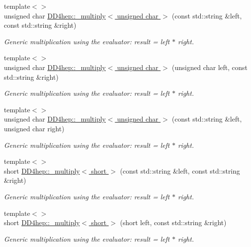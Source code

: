 \begin{DoxyCompactItemize}
{\footnotesize template$<$$>$ }\\unsigned char \hyperlink{group___d_d4_h_e_p___g_e_o_m_e_t_r_y_ga73881557b7a3e4e7b05ec0dcdb04a2ef}{D\+D4hep\+::\+\_\+multiply$<$ unsigned char $>$} (const std\+::string \&left, const std\+::string \&right)
\begin{DoxyCompactList}\small\item\em Generic multiplication using the evaluator\+: result = left $\ast$ right. \end{DoxyCompactList}\item 
{\footnotesize template$<$$>$ }\\unsigned char \hyperlink{group___d_d4_h_e_p___g_e_o_m_e_t_r_y_ga2fa2d1960c014daf990c65fcdf882712}{D\+D4hep\+::\+\_\+multiply$<$ unsigned char $>$} (unsigned char left, const std\+::string \&right)
\begin{DoxyCompactList}\small\item\em Generic multiplication using the evaluator\+: result = left $\ast$ right. \end{DoxyCompactList}\item 
{\footnotesize template$<$$>$ }\\unsigned char \hyperlink{group___d_d4_h_e_p___g_e_o_m_e_t_r_y_ga1d1e355d021670241d0fb9a437cabfc4}{D\+D4hep\+::\+\_\+multiply$<$ unsigned char $>$} (const std\+::string \&left, unsigned char right)
\begin{DoxyCompactList}\small\item\em Generic multiplication using the evaluator\+: result = left $\ast$ right. \end{DoxyCompactList}\item 
{\footnotesize template$<$$>$ }\\short \hyperlink{group___d_d4_h_e_p___g_e_o_m_e_t_r_y_gad9f1bbb2b9ed9c95a14056e96c8efa69}{D\+D4hep\+::\+\_\+multiply$<$ short $>$} (const std\+::string \&left, const std\+::string \&right)
\begin{DoxyCompactList}\small\item\em Generic multiplication using the evaluator\+: result = left $\ast$ right. \end{DoxyCompactList}\item 
{\footnotesize template$<$$>$ }\\short \hyperlink{group___d_d4_h_e_p___g_e_o_m_e_t_r_y_gab7dd39c0ea1a8022e78a51e7e5f51b80}{D\+D4hep\+::\+\_\+multiply$<$ short $>$} (short left, const std\+::string \&right)
\begin{DoxyCompactList}\small\item\em Generic multiplication using the evaluator\+: result = left $\ast$ right. \end{DoxyCompactList}\item 

\end{DoxyCompactItemize}
